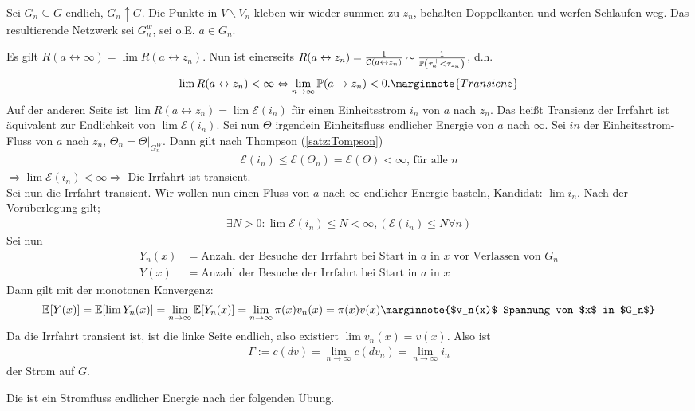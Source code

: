 \begin{beweis}
	Sei $G_n  \subseteq G$ endlich, $G_n \uparrow G$. Die Punkte in $V \backslash V_n$ kleben wir wieder summen zu $z_n$, behalten Doppelkanten und werfen Schlaufen weg. Das resultierende Netzwerk sei $G^w_n$, sei o.E. $a \in G_n$. 
	
	Es gilt $R(a \leftrightarrow \infty) = \lim R(a \leftrightarrow z_n)$.
	Nun ist einerseits $R(a \leftrightarrow z_n) = \frac{1}{\leit{a \leftrightarrow z_n}} \sim \frac{1}{\prop{\tau^+_a < \tau_{z_n}}}$, d.h. 
	\begin{equation}
		\lim R(a \leftrightarrow z_n) < \infty \Leftrightarrow \lim\limits_{n \to \infty} \prop{a \to z_n} < 0. \marginnote{Transienz}
	\end{equation}
	Auf der anderen Seite ist $\lim R(a \leftrightarrow z_n) = \lim \mathcal{E}(i_n)$ für einen Einheitsstrom $i_n$ von $a$ nach $z_n$. Das heißt Transienz der Irrfahrt ist äquivalent zur Endlichkeit von $\lim \mathcal{E}(i_n)$. Sei nun $\Theta$ irgendein Einheitsfluss endlicher Energie von $a$ nach $\infty$. Sei $in$ der Einheitsstrom-Fluss von $a$ nach $z_n$, $\Theta_n = \Theta|_{G^W_n}$. Dann gilt nach Thompson (\ref{satz:Tompson})
	\begin{align}
		\mathcal{E}(i_n) \leq \mathcal{E}(\Theta_n) = \mathcal{E}(\Theta) < \infty \text{, für alle } n
	\end{align}
	$\Rightarrow \lim \mathcal{E}(i_n) < \infty \Rightarrow$ Die Irrfahrt ist transient. \\
	
	Sei nun die Irrfahrt transient. Wir wollen nun einen Fluss von $a$ nach $\infty$ endlicher Energie basteln, Kandidat: $\lim i_n.$ Nach der Vorüberlegung gilt;
	\begin{align}
		\exists N > 0: \lim \mathcal{E}(i_n) \leq N < \infty, (\mathcal{E}(i_n)\leq N \forall n)
	\end{align}
	Sei nun 
	\begin{align}
		Y_n(x) &= \text{Anzahl der Besuche der Irrfahrt bei Start in $a$ in $x$ vor Verlassen von } G_n \\
		Y(x) &= \text{Anzahl der Besuche der Irrfahrt bei Start in $a$ in $x$} 
	\end{align}
	Dann gilt mit der monotonen Konvergenz:
	\begin{align}
		\EWE{Y(x)} = \EWE{\lim Y_n(x)} = \lim\limits_{n \to \infty} \EWE{Y_n(x)} = \lim\limits_{n \to \infty} \pi(x) v_n(x) = \pi(x)v(x) \marginnote{$v_n(x)$ Spannung von $x$ in $G_n$}
	\end{align}
	Da die Irrfahrt transient ist, ist die linke Seite endlich, also existiert $\lim v_n(x) = v(x)$. Also ist
	\begin{align}
		\Gamma := c (dv) = \lim\limits_{n\to\infty} c (dv_n) = \lim\limits_{n\to\infty} i_n
	\end{align}
	der Strom auf $G$.

	Die ist ein Stromfluss endlicher Energie nach der folgenden Übung.
\end{beweis}

